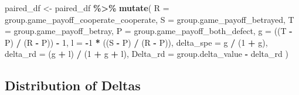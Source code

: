 \documentclass[
]{article}
\newenvironment{Shaded}{\begin{snugshade}}{\end{snugshade}}
\newcommand{\AttributeTok}[1]{\textcolor[rgb]{0.13,0.29,0.53}{#1}}
\newcommand{\DecValTok}[1]{\textcolor[rgb]{0.00,0.00,0.81}{#1}}
\newcommand{\FunctionTok}[1]{\textcolor[rgb]{0.13,0.29,0.53}{\textbf{#1}}}
\newcommand{\NormalTok}[1]{#1}
\newcommand{\OtherTok}[1]{\textcolor[rgb]{0.56,0.35,0.01}{#1}}
\newcommand{\SpecialCharTok}[1]{\textcolor[rgb]{0.81,0.36,0.00}{\textbf{#1}}}
\begin{document}
\begin{Shaded}
\begin{Highlighting}[]
\NormalTok{paired\_df }\OtherTok{\textless{}{-}}\NormalTok{ paired\_df }\SpecialCharTok{\%\textgreater{}\%}
  \FunctionTok{mutate}\NormalTok{(}
    \AttributeTok{R =}\NormalTok{ group.game\_payoff\_cooperate\_cooperate,}
    \AttributeTok{S =}\NormalTok{ group.game\_payoff\_betrayed,}
    \AttributeTok{T =}\NormalTok{ group.game\_payoff\_betray,}
    \AttributeTok{P =}\NormalTok{ group.game\_payoff\_both\_defect,}
    \AttributeTok{g =}\NormalTok{ ((T }\SpecialCharTok{{-}}\NormalTok{ P) }\SpecialCharTok{/}\NormalTok{ (R }\SpecialCharTok{{-}}\NormalTok{ P)) }\SpecialCharTok{{-}} \DecValTok{1}\NormalTok{,}
    \AttributeTok{l =} \SpecialCharTok{{-}}\DecValTok{1} \SpecialCharTok{*}\NormalTok{ ((S }\SpecialCharTok{{-}}\NormalTok{ P) }\SpecialCharTok{/}\NormalTok{ (R }\SpecialCharTok{{-}}\NormalTok{ P)),}
    \AttributeTok{delta\_spe =}\NormalTok{ g }\SpecialCharTok{/}\NormalTok{ (}\DecValTok{1} \SpecialCharTok{+}\NormalTok{ g),}
    \AttributeTok{delta\_rd  =}\NormalTok{ (g }\SpecialCharTok{+}\NormalTok{ l) }\SpecialCharTok{/}\NormalTok{ (}\DecValTok{1} \SpecialCharTok{+}\NormalTok{ g }\SpecialCharTok{+}\NormalTok{ l),}
    \AttributeTok{Delta\_rd  =}\NormalTok{ group.delta\_value }\SpecialCharTok{{-}}\NormalTok{ delta\_rd}
\NormalTok{  )}
\end{Highlighting}
\end{Shaded}

\subsection{Distribution of Deltas}\label{distribution-of-deltas}
\end{document}
